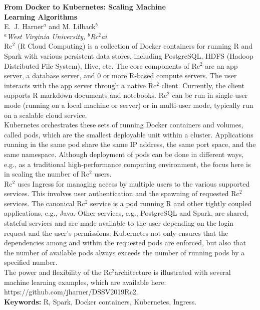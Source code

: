 
\setlength{\textwidth}{160mm}\setlength{\textheight}{240mm}
\setlength{\oddsidemargin}{0mm}\setlength{\evensidemargin}{0mm}
\setlength{\topmargin}{-10mm}
\setlength{\parindent}{0mm} 
\pagestyle{empty}	%



{\Large\bf From Docker to Kubernetes: Scaling Machine\\ Learning Algorithms}\\[4mm]

E.~J. Harner$^a$ and M. Lilback$^b$\\ 				

{\small \em $^a$West Virginia University, $^b$Rc$^2$ai}\\[3mm]

Rc$^2$ (R Cloud Computing) is a collection of Docker containers for running R and Spark with various persistent data stores, including PostgreSQL, HDFS (Hadoop Distributed File System), Hive, etc. The core components of Rc$^2$ are an app server, a database server, and 0 or more R-based compute servers.  The user interacts with the app server through a native Rc$^2$ client.  Currently, the client supports R markdown documents and notebooks. Rc$^2$ can be run in single-user mode (running on a local machine or server) or in multi-user mode, typically run on a scalable cloud service.\\

Kubernetes orchestrates these sets of running Docker containers and volumes, called pods, which are the smallest deployable unit within a cluster. Applications running in the same pod share the same IP address, the same port space, and the same namespace. Although deployment of pods can be done in different ways, e.g., as a traditional high-performance computing environment, the focus here is in scaling the number of Rc$^2$ users.\\

Rc$^2$ uses Ingress for managing access by multiple users to the various supported services. This involves user authentication and the spawning of requested Rc$^2$ services. The canonical Rc$^2$ service is a pod running R and other tightly coupled applications, e.g., Java. Other services, e.g., PostgreSQL and Spark, are shared, stateful services and are made available to the user depending on the login request and the user's permissions. Kubernetes not only ensures that the dependencies among and within the requested pods are enforced, but also that the number of available pods always exceeds the number of running pods by a specified number.\\

The power and flexibility of the Rc$^2$architecture is illustrated with several machine learning examples, which are available here: https://github.com/jharner/DSSV2019Rc2. \\

\textbf{Keywords:} R, Spark, Docker containers, Kubernetes, Ingress.



